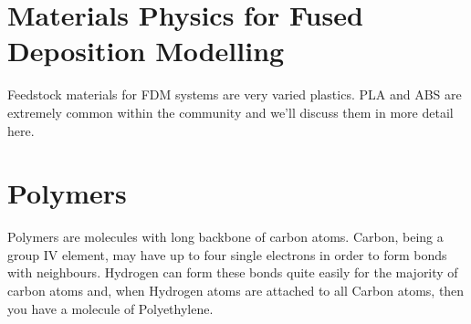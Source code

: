 
\section{Materials Physics for Fused Deposition Modelling}

Feedstock materials for FDM systems are very varied plastics. PLA and ABS are extremely common within the community and we'll discuss them in more detail here. 

\section{Polymers}

Polymers are molecules with long backbone of carbon atoms. Carbon, being a group IV element, may have up to four single electrons in order to form bonds with neighbours. Hydrogen can form these bonds quite easily for the majority of carbon atoms and, when Hydrogen atoms are attached to all Carbon atoms, then you have a molecule of Polyethylene. 


\newcommand\setpolymerdelim[2]{\def\delimleft{#1}\def\delimright{#2}}

\def\makebraces[#1,#2]#3#4#5{%
\edef\delimhalfdim{\the\dimexpr(#1+#2)/2}%
\edef\delimvshift{\the\dimexpr(#1-#2)/2}%
\chemmove{%
\node[at=(#4),yshift=(\delimvshift)]
{$\left\delimleft\vrule height\delimhalfdim depth\delimhalfdim width0pt\right.$};%
\node[at=(#5),yshift=(\delimvshift)]
{$\left.\vrule height\delimhalfdim depth\delimhalfdim width0pt\right\delimright_{\rlap{$\scriptstyle#3$}}$};}}

\setpolymerdelim() 

